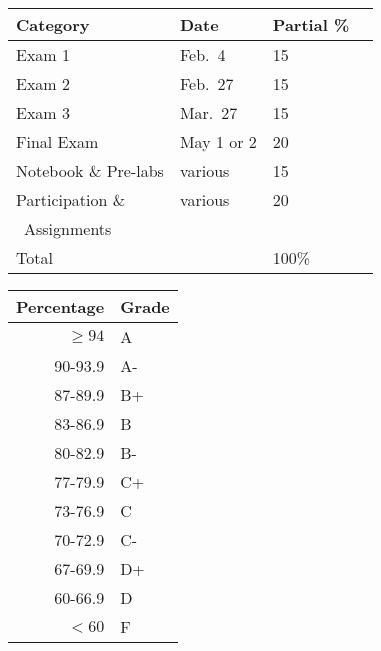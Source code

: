 \documentclass{tufte-handout}
\begin{document}
\begin{tabular}{l l l r}
Category &  Date & Partial \%  \\
\hline
 Exam 1 & Feb.\ 4 & 15 \\							%
 Exam 2 & Feb.\ 27 & 15 \\							%
 Exam 3 & Mar.\ 27 & 15 \\						%
 Final Exam & May 1 or 2 & 20 \\ 
 Notebook \& Pre-labs & various & 15 \\							%
Participation \& &  various  & 20 \\
\, Assignments \\
\hline
Total & &   100\%
\end{tabular}


\begin{margintable}
\begin{tabular}{rl}
Percentage & Grade \\
\hline 
$\ge94$ & A \\
90-93.9 & A- \\
87-89.9 & B+ \\
83-86.9 & B \\
80-82.9 & B- \\
77-79.9 & C+ \\
73-76.9 & C \\
70-72.9 & C- \\
67-69.9 & D+ \\
60-66.9 & D \\
$<60$ & F \\
\hline
\end{tabular}
\end{margintable}
\end{document}
